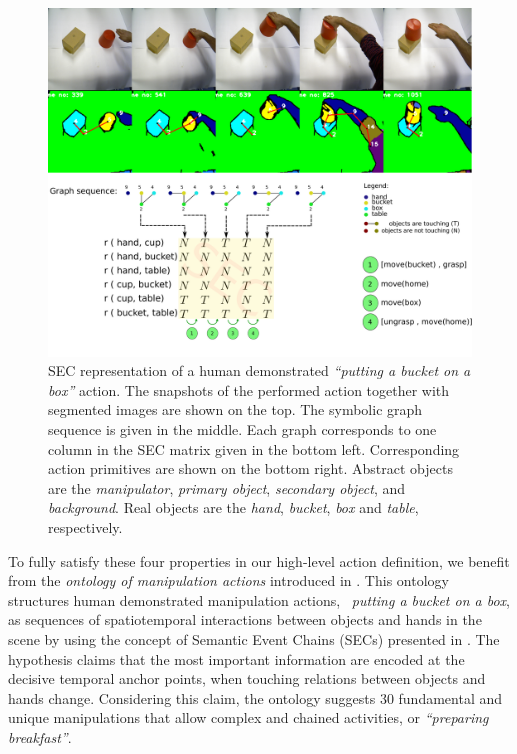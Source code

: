  
\begin{figure}[!hb]
  \centering
    \includegraphics[scale=0.25]{./pdf/action_graph_sec.pdf}
      \caption{ SEC representation of a human demonstrated {\it ``putting a bucket on a box''} action.      
       The snapshots of the performed action together with segmented images are shown on the top. 
       The symbolic graph sequence is given in the middle. Each graph corresponds to one column in the SEC matrix given in the bottom left. Corresponding action primitives are shown on the bottom right.
Abstract objects are the {\it  manipulator}, {\it primary object}, {\it secondary object}, and {\it background}.  Real objects are the {\it hand}, {\it  bucket}, {\it  box} and {\it  table}, respectively.}
      \label{fig:put_on_action}
\end{figure}

 
To fully satisfy these four properties in our high-level action definition, we benefit from the  \textit{ontology of manipulation actions} introduced in \cite{TAMD13}.
This ontology structures human demonstrated manipulation actions, \eg~{\it putting a bucket on a box}, as sequences of spatiotemporal interactions between objects and hands in the scene by using the concept of Semantic Event Chains (SECs) presented in \cite{Aksoy2011}. 
The hypothesis claims that the most important information are encoded at the decisive temporal anchor points, \ie when touching relations between objects and hands change. Considering this claim, the ontology suggests $30$ fundamental and unique manipulations that allow complex and chained activities,  or {\it ``preparing breakfast''}.

